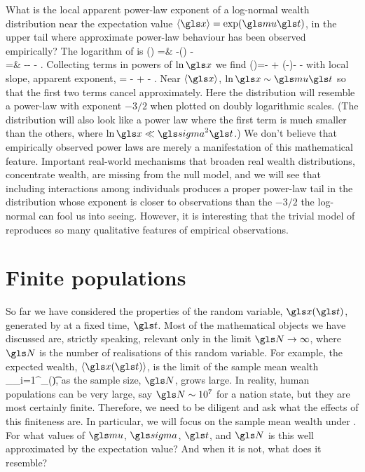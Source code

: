 What is the local apparent power-law exponent of a log-normal wealth distribution near the 
expectation value $\ave{\x}=\exp(\gmu \t)$, \ie in the upper tail where approximate power-law behaviour
has been observed empirically? The logarithm of  is
\bea
\ln \PDF(\x) =& -\ln\left(\x{}\right) -\\
=& -\ln \x - - .
\eea
Collecting terms in powers of $\ln \x$ we find
\be
\ln \PDF(\x)=-  + \left(-\right)\ln \x - -
\ee
with local slope, \ie apparent exponent,
\be
\frac{\gd\ln \PDF(\x)}{\gd \ln \x} = - \frac{\ln \x}{\gsigma^2 \t}  +  - .
\ee
Near $\ave{\x}$, $\ln \x \sim \gmu \t$ so that the first two terms cancel approximately. Here the distribution will resemble a power-law with exponent $-3/2$ when plotted on doubly logarithmic scales. (The distribution will also look like a power law where the first term is much smaller than the others, \eg where $\ln \x \ll \gsigma^2 \t$.) We don't believe that empirically observed power laws are merely a manifestation of this mathematical feature. Important real-world  mechanisms that broaden real wealth distributions, \ie concentrate wealth, are missing from the null model, and we will see that including interactions among individuals produces a proper power-law tail in the distribution whose exponent is closer to observations than the $-3/2$ the log-normal can fool us into seeing. However, it is interesting that the trivial model of \GBM reproduces so many qualitative features of empirical observations. 


\section{Finite populations}
So far we have considered the properties of the random variable, $\x(\t)$, generated by \GBM at a fixed time, $\t$. Most of the mathematical objects we have discussed are, strictly speaking, relevant only in the limit $\N\to\infty$, where $\N$ is the number of realisations of this random variable. For example, the expected wealth, $\ave{\x(\t)}$, is the limit of the sample mean wealth
\be
\ave{\x(\t)}_\N \equiv {}\sum_{i=1}^\N \x_\gi(\t),
\ee
as the sample size, $\N$, grows large. In reality, human populations can be very large, say $\N\sim10^7$ for a nation state, but they are most certainly finite. Therefore, we need to be diligent and ask what the effects of this finiteness are. In particular, we will focus on the sample mean wealth under \GBM. For what values of $\gmu$, $\gsigma$, $\t$, and $\N$ is this well approximated by the expectation value? And when it is not, what does it resemble?

